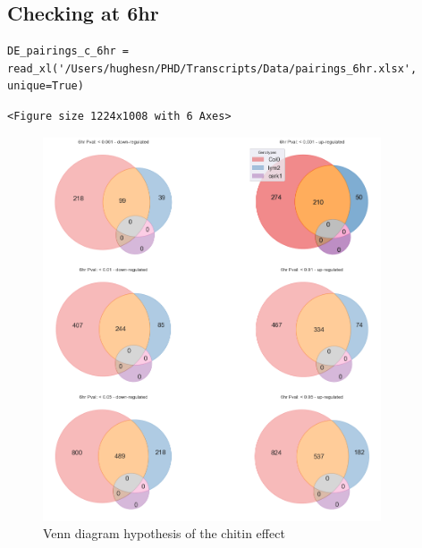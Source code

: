 \documentclass[11pt]{article}
\begin{document}
\subsection{Checking at 6hr}
\label{sec:orgf37b437}

\begin{verbatim}
DE_pairings_c_6hr = read_xl('/Users/hughesn/PHD/Transcripts/Data/pairings_6hr.xlsx', unique=True)
\end{verbatim}

\begin{verbatim}
<Figure size 1224x1008 with 6 Axes>
\end{verbatim}


\begin{figure}[htbp]
\centering
\includegraphics[width=10cm]{obipy-resources/vennTreatmentschitin6.png}
\caption{\label{vennTreatments2}
Venn diagram hypothesis of the chitin effect}
\end{figure}
\end{document}
